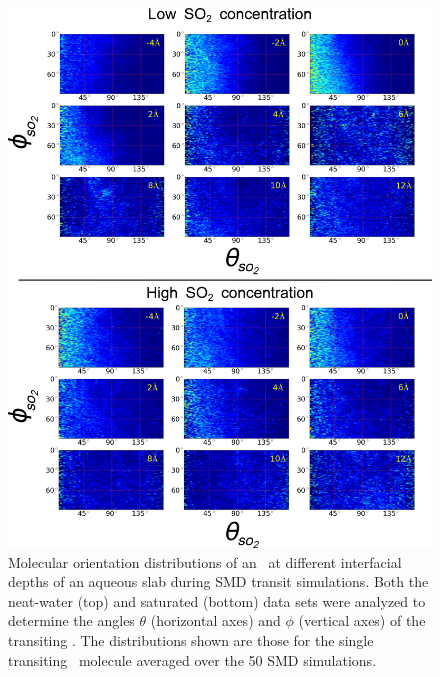 \begin{figure}[h!]
	\begin{center}
		\includegraphics[scale=1.0]{images/so2-angles/theta-phi-transit.png}
		\caption{Molecular orientation distributions of an \suldiox~at different interfacial depths of an aqueous slab during SMD transit simulations. Both the neat-water (top) and saturated (bottom) data sets were analyzed to determine the angles $\theta$ (horizontal axes) and $\phi$ (vertical axes) of the transiting \suldiox. The distributions shown are those for the single transiting \suldiox~molecule averaged over the 50 SMD simulations.}
		\label{fig:so2-transit-angles}
	\end{center}
\end{figure}

